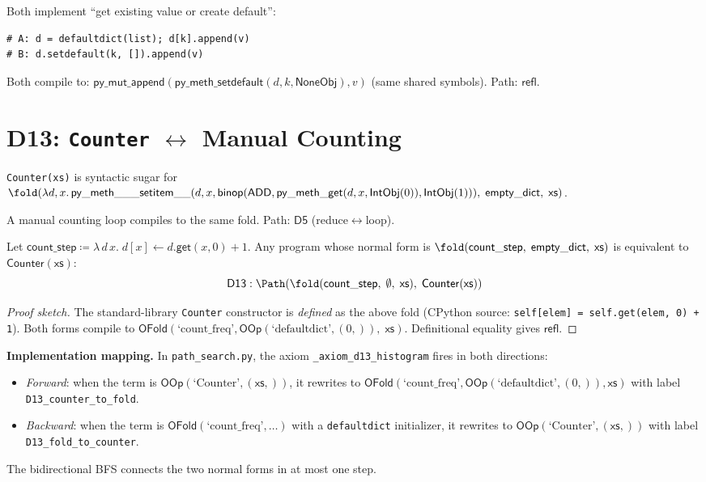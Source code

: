 Both implement ``get existing value or create default'':
\begin{lstlisting}
# A: d = defaultdict(list); d[k].append(v)
# B: d.setdefault(k, []).append(v)
\end{lstlisting}

Both compile to: $\mathsf{py\_mut\_append}(\mathsf{py\_meth\_setdefault}(d, k,
\mathsf{NoneObj}), v)$ (same shared symbols).  Path: $\mathsf{refl}$.

\section{D13: \texttt{Counter} $\leftrightarrow$ Manual Counting}
\label{sec:d13-counter}

\texttt{Counter(xs)} is syntactic sugar for
$\fold(\lambda d,x.\, \mathsf{py\_meth\_\_\_setitem\_\_}(d, x,
\mathsf{binop}(\mathsf{ADD}, \mathsf{py\_meth\_get}(d, x,
\mathsf{IntObj}(0)), \mathsf{IntObj}(1))),\; \mathsf{empty\_dict},\;
\mathsf{xs})$.

A manual counting loop compiles to the same fold.  Path:
$\mathsf{D5}$ (reduce$\leftrightarrow$loop).

\begin{theorem}
\label{thm:d13-histogram}
Let $\mathsf{count\_step} \coloneqq \lambda\, d\, x.\;
d[x] \leftarrow d.\mathsf{get}(x, 0) + 1$.
Any program whose normal form is
$\fold(\mathsf{count\_step},\;\mathsf{empty\_dict},\;\mathsf{xs})$
is equivalent to $\mathsf{Counter}(\mathsf{xs})$:
\[
  \mathsf{D13} : \Path\!\left(
    \fold(\mathsf{count\_step},\; \emptyset,\; \mathsf{xs}),\;
    \mathsf{Counter}(\mathsf{xs})
  \right)
\]
\end{theorem}

\begin{proof}[Proof sketch]
The standard-library \texttt{Counter} constructor is \emph{defined}
as the above fold (CPython source: \texttt{self[elem] = self.get(elem,
0) + 1}).  Both forms compile to $\mathsf{OFold}(\text{`count\_freq'},
\mathsf{OOp}(\text{`defaultdict'}, (0,)),\; \mathsf{xs})$.
Definitional equality gives $\mathsf{refl}$.
\end{proof}

\textbf{Implementation mapping.}
In \texttt{path\_search.py}, the axiom \texttt{\_axiom\_d13\_histogram}
fires in both directions:
\begin{itemize}
  \item \emph{Forward}: when the term is $\mathsf{OOp}(\text{`Counter'},
    (\mathsf{xs},))$, it rewrites to
    $\mathsf{OFold}(\text{`count\_freq'}, \mathsf{OOp}(\text{`defaultdict'},
    (0,)), \mathsf{xs})$ with label \texttt{D13\_counter\_to\_fold}.
  \item \emph{Backward}: when the term is
    $\mathsf{OFold}(\text{`count\_freq'}, \ldots)$ with a
    \texttt{defaultdict} initializer, it rewrites to
    $\mathsf{OOp}(\text{`Counter'}, (\mathsf{xs},))$ with label
    \texttt{D13\_fold\_to\_counter}.
\end{itemize}
The bidirectional BFS connects the two normal forms in at most one step.

